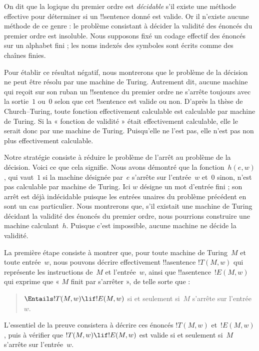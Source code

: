 \documentclass[../../../include/open-logic-section]{subfiles}
\begin{document}

On dit que la logique du premier ordre est \emph{décidable}
s'il existe une méthode effective pour déterminer si un
!!{sentence} donné est valide. Or il n'existe aucune méthode
de ce genre : le problème consistant à décider la validité
des énoncés du premier ordre est insoluble. Nous supposons fixé un codage effectif des énoncés sur un alphabet fini ; les noms indexés des symboles sont écrits comme des chaînes finies.

Pour établir ce résultat négatif, nous montrerons que le
problème de la décision ne peut être résolu par une machine
de Turing. Autrement dit, aucune machine qui reçoit sur son
ruban un !!{sentence} du premier ordre ne s'arrête toujours
avec la sortie~$1$ ou~$0$ selon que cet !!{sentence} est valide ou
non. D'après la thèse de Church--Turing, toute fonction
effectivement calculable est calculable par machine de Turing.
Si la « fonction de validité » était effectivement calculable,
elle le serait donc par une machine de Turing. Puisqu'elle ne
l'est pas, elle n'est pas non plus effectivement calculable.

Notre stratégie consiste à réduire le problème de l'arrêt
au problème de la décision. Voici ce que cela signifie.
Nous avons démontré que la fonction~$h(e,w)$, qui vaut~$1$
si la machine désignée par~$e$ s'arrête sur l'entrée~$w$
et~$0$ sinon, n'est pas calculable par machine de Turing. Ici $w$ désigne un mot d'entrée fini ; son arrêt est déjà indécidable puisque les entrées unaires du problème précédent en sont un cas particulier.
Nous montrerons que, s'il existait une machine de Turing
décidant la validité des énoncés du premier ordre, nous
pourrions construire une machine calculant~$h$. Puisque
c'est impossible, aucune machine ne décide la validité.

La première étape consiste à montrer que, pour toute
machine de Turing~$M$ et toute entrée~$w$, nous pouvons
décrire effectivement !!a{sentence} $!T(M, w)$ qui représente
les instructions de~$M$ et l'entrée~$w$, ainsi que
!!a{sentence}~$!E(M, w)$ qui exprime que « $M$ finit par
s'arrêter », de telle sorte que :
\begin{quote}
  $\Entails !T(M, w) \lif !E(M,w)$ si et seulement si~$M$
  s'arrête sur l'entrée~$w$.
\end{quote}
L'essentiel de la preuve consistera à décrire ces énoncés
$!T(M, w)$ et~$!E(M, w)$, puis à vérifier que
$!T(M, w) \lif !E(M, w)$ est valide si et seulement si~$M$
s'arrête sur l'entrée~$w$.
\end{document}
